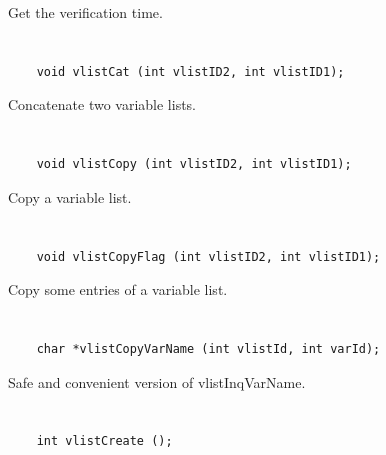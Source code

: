 Get the verification time.


\section*{\tt {}}

\begin{verbatim}
    void vlistCat (int vlistID2, int vlistID1);
\end{verbatim}

Concatenate two variable lists.


\section*{\tt {}}

\begin{verbatim}
    void vlistCopy (int vlistID2, int vlistID1);
\end{verbatim}

Copy a variable list.


\section*{\tt {}}

\begin{verbatim}
    void vlistCopyFlag (int vlistID2, int vlistID1);
\end{verbatim}

Copy some entries of a variable list.


\section*{\tt {}}

\begin{verbatim}
    char *vlistCopyVarName (int vlistId, int varId);
\end{verbatim}

Safe and convenient version of vlistInqVarName.


\section*{\tt {}}

\begin{verbatim}
    int vlistCreate ();
\end{verbatim}

